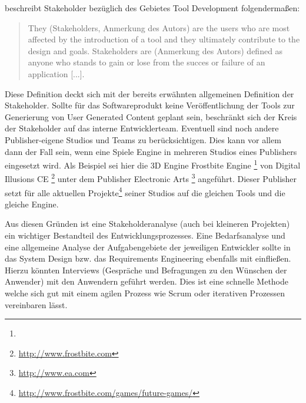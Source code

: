 \documentclass[pagesize, paper=a4, fontsize=12pt, titlepage=true, headings=small, headnosepline, abstractoff, liststotoc, nochapterprefix, plainheadsepline, twoside]{scrreprt}
\begin{document}
\autocite{Wihlidal2006} beschreibt Stakeholder bezüglich des Gebietes Tool Development folgendermaßen:
\begin{quote}
\glqq They (Stakeholders, Anmerkung des Autors) are the users who are most affected by the introduction of a tool and they ultimately contribute to the design and goals. Stakeholders are (Anmerkung des Autors) defined as anyone who stands to gain or lose from the succes or failure of an application [...].\grqq{} \parencite[S. 4-5]{Wihlidal2006}
\end{quote}
Diese Definition deckt sich mit der bereits erwähnten allgemeinen Definition der Stakeholder. Sollte für das Softwareprodukt keine Veröffentlichung der Tools zur Generierung von User Generated Content geplant sein, beschränkt sich der Kreis der Stakeholder auf das interne Entwicklerteam. Eventuell sind noch andere Publisher-eigene Studios und Teams zu berücksichtigen. Dies kann vor allem dann der Fall sein, wenn eine Spiele Engine in mehreren Studios eines Publishers eingesetzt wird. Als Beispiel sei hier die 3D Engine Frostbite Engine \footnote{} von Digital Illusions CE \footnote{\url{http://www.frostbite.com}} unter dem Publisher Electronic Arts \footnote{\url{http://www.ea.com}} angeführt. Dieser Publisher setzt für alle aktuellen Projekte\footnote{\url{http://www.frostbite.com/games/future-games/}} seiner Studios auf die gleichen Tools und die gleiche Engine.

Aus diesen Gründen ist eine Stakeholderanalyse (auch bei kleineren Projekten) ein wichtiger Bestandteil des Entwicklungsprozesses. Eine Bedarfsanalyse und eine allgemeine Analyse der Aufgabengebiete der jeweiligen Entwickler sollte in das System Design bzw. das Requirements Engineering ebenfalls mit einfließen. Hierzu könnten Interviews (Gespräche und Befragungen zu den Wünschen der Anwender) mit den Anwendern geführt werden. Dies ist eine schnelle Methode welche sich gut mit einem agilen Prozess wie Scrum oder iterativen Prozessen vereinbaren lässt.
\end{document}
